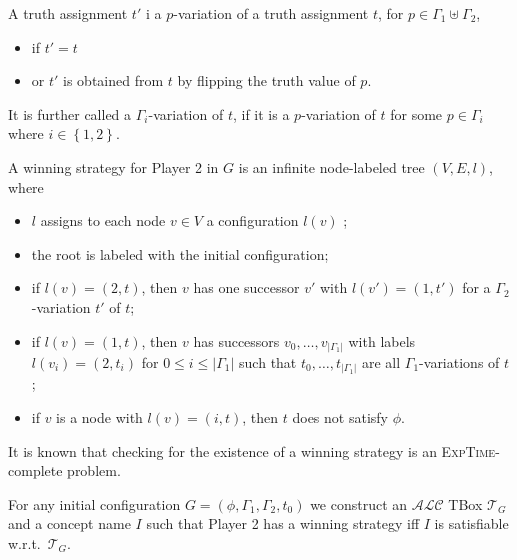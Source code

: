 A truth assignment $t'$ i a $p$-variation of a truth assignment $t$, for $p \in \Gamma_1 \uplus \Gamma_2$,
\begin{itemize}
	\item if $t' = t$ 
	\item or $t'$ is obtained from $t$ by flipping the truth value of $p$.
\end{itemize}
It is further called a $\Gamma_i$-variation of $t$, if it is a $p$-variation of $t$ for some $p \in \Gamma_i$ where $i \in \left\{ 1,2 \right\}$.

A winning strategy for Player 2 in $G$ is an infinite node-labeled tree $(V,E,l)$, where
\begin{itemize}
	\item $l$ assigns to each node $v \in V$ a configuration $l(v)$ ;
	\item the root is labeled with the initial configuration;
	\item if $l(v) = (2,t)$, then $v$ has one successor $v'$ with $l(v') = (1,t')$ for a  $\Gamma_2$-variation $t'$ of $t$;
	\item if $l(v) = (1,t)$, then $v$ has successors $v_0, \ldots, v_{\lvert \Gamma_1 \rvert}$ with labels
		$l(v_i) = (2,t_i)$ for $0 \leq i \leq \lvert \Gamma_1 \rvert$ such that $t_0, \ldots, t_{\lvert \Gamma_1 \rvert}$ 
		are all $\Gamma_1$-variations of $t$ ;
	\item if $v$ is a node with $l(v) = (i,t)$, then $t$ does not satisfy $\phi$.
\end{itemize}
It is known that checking for the existence of a winning strategy is an \textsc{ExpTime}-complete problem.

For any initial configuration $G = (\phi, \Gamma_1, \Gamma_2, t_0)$ we construct an $\mathcal{ALC}$ TBox $\mathcal{T}_G$ 
and a concept name $I$ such that Player 2 has a winning strategy iff $I$ is satisfiable w.r.t.\ $\mathcal{T}_G$.

